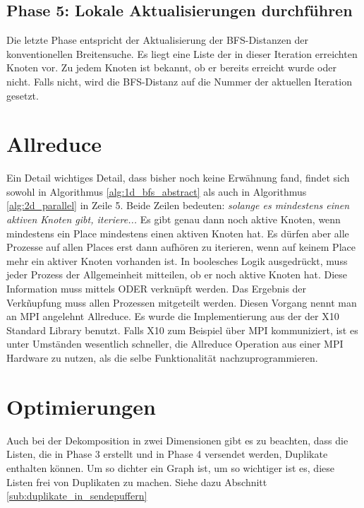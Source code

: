 \subsection{Phase 5: Lokale Aktualisierungen durchführen} %
\label{ssub:lokale_updates_durchf_hren}
Die letzte Phase entspricht der Aktualisierung der BFS-Distanzen der konventionellen Breitensuche. Es liegt eine Liste der in dieser Iteration erreichten Knoten vor. Zu jedem Knoten ist bekannt, ob er bereits erreicht wurde oder nicht. Falls nicht, wird die BFS-Distanz auf die Nummer der aktuellen Iteration gesetzt.

\section{Allreduce} %
\label{sub:allreduce}
Ein Detail wichtiges Detail, dass bisher noch keine Erwähnung fand, findet sich sowohl in Algorithmus \ref{alg:1d_bfs_abstract} als auch in Algorithmus \ref{alg:2d_parallel} in Zeile 5. Beide Zeilen bedeuten: \textit{solange es mindestens einen aktiven Knoten gibt, iteriere...} Es gibt genau dann noch aktive Knoten, wenn mindestens ein Place mindestens einen aktiven Knoten hat. Es dürfen aber alle Prozesse auf allen Places erst dann aufhören zu iterieren, wenn auf keinem Place mehr ein aktiver Knoten vorhanden ist. In boolesches Logik ausgedrückt, muss jeder Prozess der Allgemeinheit mitteilen, ob er noch aktive Knoten hat. Diese Information muss mittels ODER verknüpft werden. Das Ergebnis der Verkñupfung muss allen Prozessen mitgeteilt werden. Diesen Vorgang nennt man an MPI angelehnt Allreduce. Es wurde die Implementierung aus der der X10 Standard Library benutzt. Falls X10 zum Beispiel über MPI kommuniziert, ist es unter Umständen wesentlich schneller, die Allreduce Operation aus einer MPI Hardware zu nutzen, als die selbe Funktionalität nachzuprogrammieren.  

\section{Optimierungen} %
\label{sec:optimierungen}
Auch bei der Dekomposition in zwei Dimensionen gibt es zu beachten, dass die Listen, die in Phase 3 erstellt und in Phase 4 versendet werden, Duplikate enthalten können. Um so dichter ein Graph ist, um so wichtiger ist es, diese Listen frei von Duplikaten zu machen. Siehe dazu Abschnitt \ref{sub:duplikate_in_sendepuffern}
